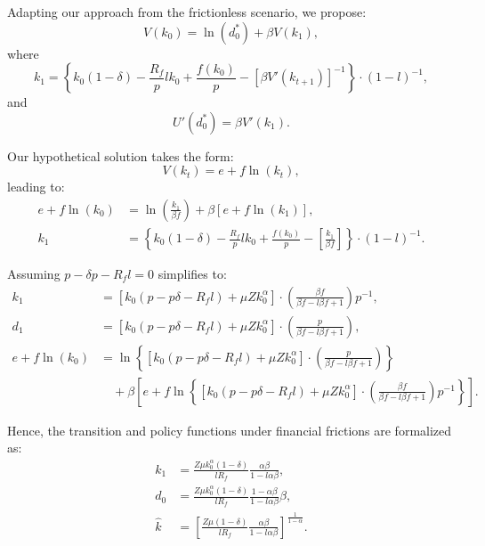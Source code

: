 \documentclass[12pt]{article}
\begin{document}
Adapting our approach from the frictionless scenario, we propose:
\begin{equation}
    V(k_0) = \ln(d_0^*) + \beta V(k_1),
\end{equation}
where
\begin{equation}
    k_1 = \left\{ k_0(1 - \delta) - \frac{R_f}{p} l k_0 + \frac{f(k_0)}{p} - \left[ \beta V'(k_{t+1}) \right]^{-1} \right\} \cdot \left(1-l\right)^{-1},
\end{equation}
and
\begin{equation}
    U'(d_0^*) = \beta V'(k_1).
\end{equation}

Our hypothetical solution takes the form:
\begin{equation}
    V(k_t) = e + f \ln(k_t),
\end{equation}
leading to:
\begin{align}
    e + f \ln(k_0) &= \ln\left( \frac{k_1}{\beta f} \right) + \beta \left[ e + f \ln(k_1) \right], \\
    k_1 &= \left\{ k_0(1 - \delta) - \frac{R_f}{p} l k_0 + \frac{f(k_0)}{p} - \left[ \frac{k_1}{\beta f} \right] \right\} \cdot \left(1-l\right)^{-1}.
\end{align}

Assuming \(p - \delta p - R_f l = 0\) simplifies to:
\begin{align}
    k_1 &= \left[ k_0(p - p\delta - R_f l) + \mu Z k_0^{\alpha} \right] \cdot \left( \frac{\beta f}{\beta f - l\beta f + 1} \right) p^{-1}, \\
    d_1 &= \left[ k_0(p - p\delta - R_f l) + \mu Z k_0^{\alpha} \right] \cdot \left( \frac{p}{\beta f - l\beta f + 1} \right), \\
    e + f \ln(k_0) &= \ln \left\{ \left[ k_0(p - p\delta - R_f l) + \mu Z k_0^{\alpha} \right] \cdot \left( \frac{p}{\beta f - l\beta f + 1} \right) \right\} \nonumber \\
    &\quad + \beta \left[ e + f \ln \left\{ \left[ k_0(p - p\delta - R_f l) + \mu Z k_0^{\alpha} \right] \cdot \left( \frac{\beta f}{\beta f - l\beta f + 1} \right) p^{-1} \right\} \right].
\end{align}

Hence, the transition and policy functions under financial frictions are formalized as:
\begin{align}
    k_1 &= \frac{Z \mu k_0^{\alpha} (1-\delta)}{l R_f} \frac{\alpha\beta}{1-l\alpha\beta}, \\
    d_0 &= \frac{Z \mu k_0^{\alpha} (1-\delta)}{l R_f} \frac{1-\alpha\beta}{1-l\alpha\beta} \beta, \\
    \widehat{k} &= \left[ \frac{Z \mu (1-\delta)}{l R_f} \frac{\alpha\beta}{1-l\alpha\beta} \right]^{\frac{1}{1-\alpha}}.
\end{align}
\end{document}
